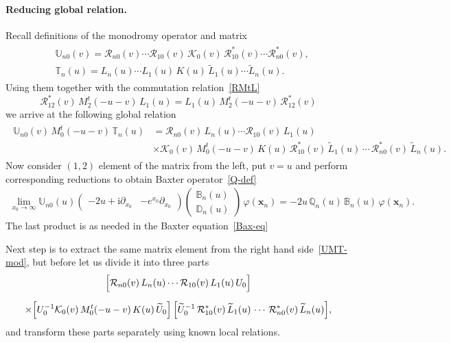 \documentclass[11pt]{article}
\numberwithin{equation}{section}
\theoremstyle{plain}
\theoremstyle{definition}
\newcommand{\T}{\mathbb{T}}
\newcommand{\B}{\mathbb{B}}
\newcommand{\D}{\mathbb{D}}
\newcommand{\QQ}{\mathbb{Q}}
\newcommand{\MMO}{\mathbb{U}}
\renewcommand{\phi}{\varphi}
\renewcommand{\imath}{\mathrm{i}}
\begin{document}
\paragraph{Reducing global relation.}
Recall definitions of the monodromy operator and matrix
\begin{align} \label{Mon-op-matr}
	\begin{aligned}
		& \MMO_{n0}(v) = \mathcal{R}_{n0}(v) \cdots \mathcal{R}_{10}(v) \, \mathcal{K}_0(v) \, \mathcal{R}^*_{10}(v) \cdots \mathcal{R}^*_{n0}(v), \\[6pt]
		& \T_n(u) = L_n(u) \cdots L_1(u) \, K(u) \, \widetilde{L}_1(u) \cdots \widetilde{L}_n(u).
	\end{aligned}
\end{align}
Using them together with the commutation relation~\eqref{RMtL}
\begin{equation} \label{RMtL2}
	\mathcal{R}^*_{12}(v) \, M^t_2(-u-v) \, L_1(u) = L_1(u ) \, M^t_2(-u-v) \, \mathcal{R}^*_{12}(v)
\end{equation}
we arrive at the following global relation
\begin{align} \label{UMT-mod}
	\begin{aligned}
		\MMO_{n0}(v) \, M_0^t(- u - v) \, \T_n(u) &=  
		\mathcal{R}_{n0}(v) \, L_n(u) \cdots \mathcal{R}_{10}(v) \, L_1(u)\, \\[6pt]   
		& \times \mathcal{K}_0(v)\, M_0^t(- u - v) \, K(u) \,
		\mathcal{R}^*_{10}(v)\, 
		\widetilde{L}_1(u)\,\cdots\, \mathcal{R}^*_{n0}(v)\,\widetilde{L}_n(u).
	\end{aligned}
\end{align}
Now consider $(1,2)$ element of the matrix from the left, put $v = u$ and perform corresponding reductions to obtain Baxter operator~\eqref{Q-def}
\begin{align}
\lim_{x_{0} \to \infty} \MMO_{n 0}(u) 
\begin{pmatrix}
		-2u + \imath \partial_{x_0} & -e^{x_0} \partial_{x_0}
\end{pmatrix} 
\begin{pmatrix}
	\B_n(u) \\[4pt]
	\D_n(u)
\end{pmatrix}\,\phi(\bm{x}_n) = -2u \, \QQ_n(u)\, \B_n(u) \, \phi(\bm{x}_n).
\end{align}
The last product is as needed in the Baxter equation~\eqref{Bax-eq}

Next step is to extract the same matrix element from the right hand side~\eqref{UMT-mod}, but before let us divide it into three parts
\begin{multline} \label{RHS-3pt}
	\Bigl[ \mathcal{R}_{n0}(v) \, L_n(u) \cdots \mathcal{R}_{10}(v) \, L_1(u) \, U_0 \Bigr] \\[6pt]   
	\times \Bigl[ U_0^{-1} \mathcal{K}_0(v)\, M_0^t(- u - v) \, K(u) \, \widetilde{U}_0 \Bigr] \, \Bigl[ \widetilde{U}_0^{-1} \, \mathcal{R}^*_{10}(v)\, 
	\widetilde{L}_1(u)\,\cdots\, \mathcal{R}^*_{n0}(v)\,\widetilde{L}_n(u)	\Bigr],
\end{multline}
and transform these parts separately using known local relations.
\end{document}
